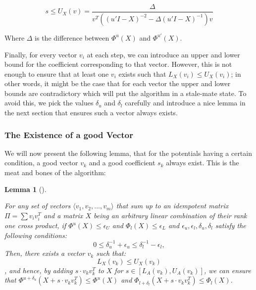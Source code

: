 \documentclass[
  letterpaper,
  DIV=11,
  numbers=noendperiod]{scrartcl}
\theoremstyle{plain}
\theoremstyle{plain}
\theoremstyle{plain}
\newtheorem{lemma}{Lemma}[section]
\theoremstyle{definition}
\theoremstyle{plain}
\theoremstyle{remark}
\begin{document}
\begin{equation} \tag{2}\label{eq:upper-bound-potential}
s \le U_X(v) = \frac{\Delta}{v^T \left((u' I - X)^{-2} - \Delta (u' I - X)^{-1}\right)v}
\end{equation}

Where \(\Delta\) is the difference between \(\Phi^u(X)\) and
\(\Phi^{u'}(X)\).

Finally, for every vector \(v_i\) at each step, we can introduce an
upper and lower bound for the coefficient corresponding to that vector.
However, this is not enough to ensure that at least one \(v_i\) exists
such that \(L_X(v_i) \le U_X(v_i)\); in other words, it might be the
case that for each vector the upper and lower bounds are contradictory
which will put the algorithm in a stale-mate state. To avoid this, we
pick the values \(\delta_u\) and \(\delta_l\) carefully and introduce a
nice lemma in the next section that ensures such a vector always exists.

\hypertarget{the-existence-of-a-good-vector}{%
\subsubsection{The Existence of a good
Vector}\label{the-existence-of-a-good-vector}}

We will now present the following lemma, that for the potentials having
a certain condition, a good vector \(v_k\) and a good coefficient
\(s_k\) always exist. This is the meat and bones of the algorithm:

\leavevmode{}%
\begin{lemma}[]\label{lem-good-vector-existance}

For any set of vectors \(\langle v_1, v_2, ..., v_m \rangle\) that sum
up to an idempotent matrix \(\Pi = \sum v_i v_i^T\) and a matrix \(X\)
being an arbitrary linear combination of their rank one cross product,
if \(\Phi^u(X) \le \epsilon_U\) and \(\Phi_l(X) \le \epsilon_L\) and
\(\epsilon_u, \epsilon_l, \delta_u, \delta_l\) satisfy the following
conditions:
\[0 \le \delta_u^{-1} + \epsilon_u \le \delta_l^{-1} - \epsilon_l,\]
Then, there exists a vector \(v_k\) such that: \[L_X(v_k) \le U_X(v_k)\]
, and hence, by adding \(s \cdot v_k v_k^T\) to \(X\) for
\(s \in [L_A(v_k), U_A(v_k)]\), we can ensure that
\(\Phi^{u + \delta_u}(X + s \cdot v_k v_k^T) \le \Phi^{u}(X)\) and
\(\Phi_{l + \delta_l}(X + s \cdot v_k v_k^T) \le \Phi_l(X)\).

\end{lemma}
\end{document}
